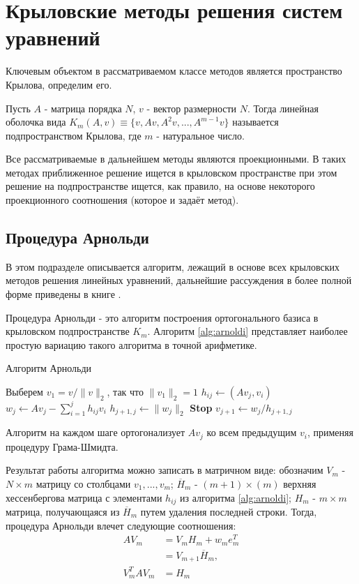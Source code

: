 \section{Крыловские методы решения систем уравнений}
\label{sec:Chapter2} 
Ключевым объектом в рассматриваемом классе методов является пространство Крылова, определим его.
\begin{definition}
    Пусть $A$ - матрица порядка $N$, $v$ - вектор размерности $N$. Тогда линейная
    оболочка вида $K_m\left(A,v\right) \equiv \{v,Av,A^2v,...,A^{m-1}v\} $ называется 
    подпространством Крылова, где $m$ - натуральное число. 
\end{definition}
Все рассматриваемые в дальнейшем методы являются проекционными.
В таких методах приближенное решение ищется в крыловском пространстве при этом 
решение на подпространстве ищется, как правило, на основе некоторого проекционного
 соотношения (которое и задаёт метод).
\subsection[Процедура Арнольди]{Процедура Арнольди}

В этом подразделе описывается алгоритм, лежащий в основе всех крыловских методов 
решения линейных уравнений, дальнейшие рассуждения в более полной форме приведены в 
книге \cite{Saad2003}.

Процедура Арнольди - это алгоритм построения ортогонального базиса в крыловском
подпространстве $K_m$. Алгоритм \ref{alg:arnoldi} представляет наиболее простую
вариацию такого алгоритма в точной арифметике.
\begin{algorithm}[H]
    \caption{Алгоритм Арнольди}\label{alg:arnoldi}
    \begin{algorithmic}[1]
    \State Выберем $v_1 = v / \|v\|_2$, так что $\|v_1\|_2 = 1$
    \Statex
            \State $h_{ij} \gets (Av_j, v_i)$
        \EndFor
        \State $w_j \gets Av_j - \sum_{i=1}^j h_{ij}v_i$
        \State $h_{j+1,j} \gets \|w_j\|_2$
            \State \textbf{Stop}
        \EndIf
        \State $v_{j+1} \gets w_j/h_{j+1,j}$
    \EndFor
    \end{algorithmic}
\end{algorithm}
Алгоритм на каждом шаге ортогонализует $Av_j$ ко всем предыдущим $v_i$, 
применяя процедуру Грама-Шмидта. 
\par Результат работы алгоритма можно записать в матричном
виде: обозначим $V_m$ - $N \times m$ матрицу со столбцами $v_1,...,v_m$; 
$\overline{H}_m$ - $\left(m+1\right) \times \left( m \right)$  верхняя хессенбергова матрица с 
элементами $h_{ij}$ из алгоритма \ref{alg:arnoldi}; ${H}_m$ - $ m \times m $ матрица, 
получающаяся из $\overline{H}_m$ путем удаления последней строки. Тогда, процедура Арнольди
влечет следующие соотношения:
\begin{align}
    AV_m &= V_m H_m + w_m e_m^T \\
         &= V_{m+1} \overline{H}_m,\\
    V_m^T A V_m &= H_m \label{eq:VAVHM}
\end{align} 
